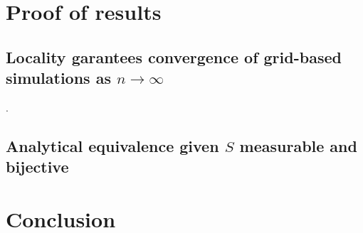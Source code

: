 \documentclass[10pt,letterpaper]{article}
\begin{document}
\section{Proof of results}

\subsection{Locality garantees convergence of grid-based simulations as $n \to \infty$}.

\subsection{Analytical equivalence given $S$ measurable and bijective}
\label{sec:proof-equivalence}


\section{Conclusion}






\end{document}
